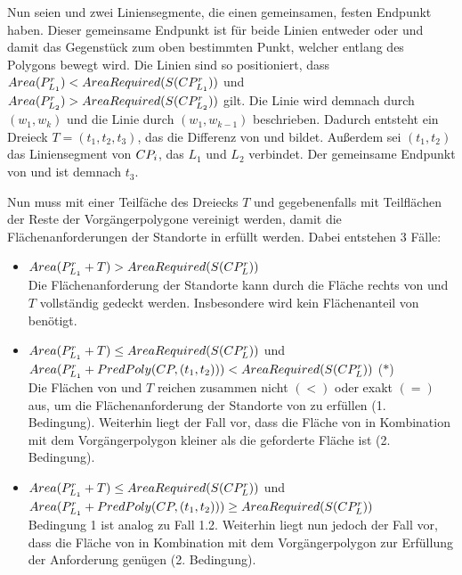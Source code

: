 \documentclass[ngerman]{seminarbeitrag}
\begin{document}
Nun seien \leins und \lzwei zwei Liniensegmente, die einen gemeinsamen, festen Endpunkt haben. Dieser gemeinsame Endpunkt ist für beide Linien entweder \ls oder \Le und damit das Gegenstück zum oben bestimmten Punkt, welcher entlang des Polygons bewegt wird. Die Linien sind so positioniert, dass $Area(P^{r}_{L_{1}}) < AreaRequired(S(CP^{r}_{L_{1}}))$ und $Area(P^{r}_{L_{2}}) > AreaRequired(S(CP^{r}_{L_{2}}))$ gilt. Die Linie \lzwei wird demnach durch $(w_{1}, w_{k})$ und die Linie \leins durch $(w_{1}, w_{k-1})$ beschrieben.
Dadurch entsteht ein Dreieck $T = (t_{1}, t_{2}, t_{3})$, das die Differenz von \cprleins und \cprlzwei bildet. Außerdem sei $(t_{1}, t_{2})$ das Liniensegment von $CP_{i}$, das $L_{1}$ und $L_{2}$ verbindet. Der gemeinsame Endpunkt von \leins und \lzwei ist demnach $t_{3}$.

Nun muss \cprleins mit einer Teilfäche des Dreiecks $T$ und gegebenenfalls mit Teilflächen der Reste der Vorgängerpolygone vereinigt werden, damit die Flächenanforderungen der Standorte in \cprleins erfüllt werden. Dabei entstehen 3 Fälle:

\begin{itemize}
\item $Area(P_{L_{1}}^{r} + T) > AreaRequired(S(CP_{L}^{r}))$ \\
Die Flächenanforderung der Standorte kann durch die Fläche rechts von \leins und $T$ vollständig gedeckt werden. Insbesondere wird kein Flächenanteil von  benötigt. 
\item $Area(P_{L_{1}}^{r} +T) \le AreaRequired(S(CP_{L}^{r}))$ und \\ $Area(P_{L_{1}}^{r}+PredPoly(CP,(t_{1},t_{2})))<AreaRequired(S(CP_{L}^{r}))$ \hfill ($\ast$) \\
Die Flächen von \prleins und $T$ reichen zusammen nicht $(<)$ oder exakt $(=)$ aus, um die Flächenanforderung der Standorte von \cprl zu erfüllen (1. Bedingung). Weiterhin liegt der Fall vor, dass die Fläche von \prleins in Kombination mit dem Vorgängerpolygon  kleiner als die geforderte Fläche ist (2. Bedingung).
\item $Area(P_{L_{1}}^{r} +T) \le AreaRequired(S(CP_{L}^{r}))$ und \\ $Area(P_{L_{1}}^{r}+PredPoly(CP,(t_{1},t_{2})))\ge AreaRequired(S(CP_{L}^{r}))$ \\
Bedingung 1 ist analog zu Fall 1.2. Weiterhin liegt nun jedoch der Fall vor, dass die Fläche von \prleins in Kombination mit dem Vorgängerpolygon zur Erfüllung der Anforderung genügen (2. Bedingung).
\end{itemize}
\end{document}
